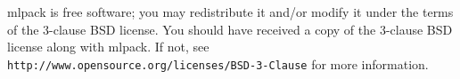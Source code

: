 mlpack is free software; you may redistribute it and/or modify it under the terms of the 3-\/clause B\+SD license. You should have received a copy of the 3-\/clause B\+SD license along with mlpack. If not, see {\tt http\+://www.\+opensource.\+org/licenses/\+B\+S\+D-\/3-\/\+Clause} for more information. 